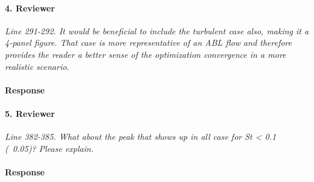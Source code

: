 \documentclass[]{article}
\begin{document}
\hrulefill

\paragraph{4. Reviewer} \textit{Line 291-292. It would be beneficial to include the turbulent case also, making it a 4-panel figure. That case is more representative of an ABL flow and therefore provides the reader a better sense of the optimization convergence in a more realistic scenario.}

\paragraph{Response} 

\hrulefill

\paragraph{5. Reviewer} \textit{Line 382-385. What about the peak that shows up in all case for St < 0.1 (~0.05)? Please explain.}

\paragraph{Response} 


\hrulefill
\end{document}
